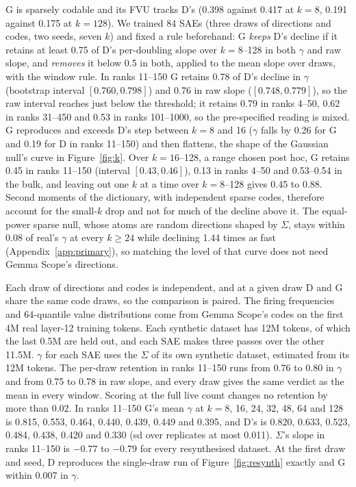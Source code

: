 \documentclass[10pt,twocolumn]{article}
\newcommand{\Sig}{\Sigma}
\begin{document}
G is sparsely codable and its FVU tracks D's (0.398 against 0.417 at $k=8$, 0.191 against 0.175 at $k=128$). We trained 84 SAEs (three draws of directions and codes, two seeds, seven $k$) and fixed a rule beforehand: G \emph{keeps} D's decline if it retains at least 0.75 of D's per-doubling slope over $k=8$--128 in both $\gamma$ and raw slope, and \emph{removes} it below 0.5 in both, applied to the mean slope over draws, with the window rule. In ranks 11--150 G retains 0.78 of D's decline in $\gamma$ (bootstrap interval $[0.760, 0.798]$) and 0.76 in raw slope ($[0.748, 0.779]$), so the raw interval reaches just below the threshold; it retains 0.79 in ranks 4--50, 0.62 in ranks 31--450 and 0.53 in ranks 101--1000, so the pre-specified reading is mixed. G reproduces and exceeds D's step between $k=8$ and 16 ($\gamma$ falls by 0.26 for G and 0.19 for D in ranks 11--150) and then flattens, the shape of the Gaussian null's curve in Figure~\ref{fig:k}. Over $k=16$--128, a range chosen post hoc, G retains 0.45 in ranks 11--150 (interval $[0.43, 0.46]$), 0.13 in ranks 4--50 and 0.53--0.54 in the bulk, and leaving out one $k$ at a time over $k=8$--128 gives 0.45 to 0.88. Second moments of the dictionary, with independent sparse codes, therefore account for the small-$k$ drop and not for much of the decline above it. The equal-power sparse null, whose atoms are random directions shaped by $\Sig$, stays within 0.08 of real's $\gamma$ at every $k \ge 24$ while declining 1.44 times as fast (Appendix~\ref{app:primary}), so matching the level of that curve does not need Gemma Scope's directions.

Each draw of directions and codes is independent, and at a given draw D and G share the same code draws, so the comparison is paired. The firing frequencies and 64-quantile value distributions come from Gemma Scope's codes on the first 4M real layer-12 training tokens. Each synthetic dataset has 12M tokens, of which the last 0.5M are held out, and each SAE makes three passes over the other 11.5M. $\gamma$ for each SAE uses the $\Sig$ of its own synthetic dataset, estimated from its 12M tokens. The per-draw retention in ranks 11--150 runs from 0.76 to 0.80 in $\gamma$ and from 0.75 to 0.78 in raw slope, and every draw gives the same verdict as the mean in every window. Scoring at the full live count changes no retention by more than 0.02. In ranks 11--150 G's mean $\gamma$ at $k=8$, 16, 24, 32, 48, 64 and 128 is 0.815, 0.553, 0.464, 0.440, 0.439, 0.449 and 0.395, and D's is 0.820, 0.633, 0.523, 0.484, 0.438, 0.420 and 0.330 (sd over replicates at most 0.011). $\Sig$'s slope in ranks 11--150 is $-0.77$ to $-0.79$ for every resynthesised dataset. At the first draw and seed, D reproduces the single-draw run of Figure~\ref{fig:resynth} exactly and G within 0.007 in $\gamma$.
\end{document}
